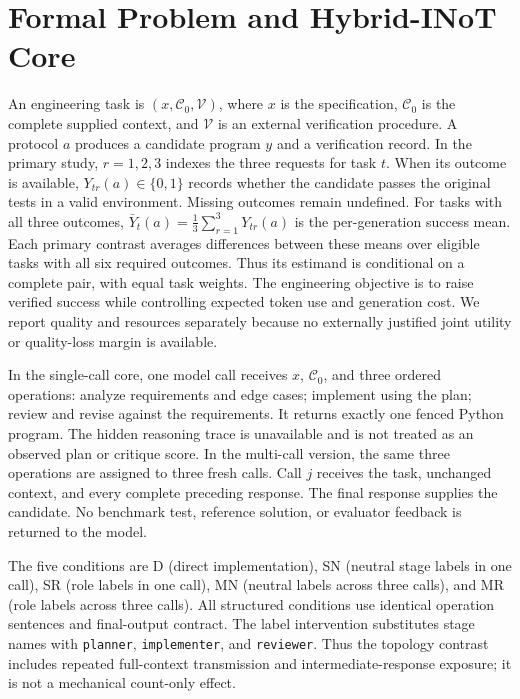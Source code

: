 \section{Formal Problem and Hybrid-INoT Core}
An engineering task is $(x,\mathcal{C}_0,\mathcal{V})$, where $x$ is the specification, $\mathcal{C}_0$ is the complete supplied context, and $\mathcal{V}$ is an external verification procedure. A protocol $a$ produces a candidate program $y$ and a verification record. In the primary study, $r=1,2,3$ indexes the three requests for task $t$. When its outcome is available, $Y_{tr}(a)\in\{0,1\}$ records whether the candidate passes the original tests in a valid environment. Missing outcomes remain undefined. For tasks with all three outcomes, $\bar Y_t(a)=\frac{1}{3}\sum_{r=1}^{3}Y_{tr}(a)$ is the per-generation success mean. Each primary contrast averages differences between these means over eligible tasks with all six required outcomes. Thus its estimand is conditional on a complete pair, with equal task weights. The engineering objective is to raise verified success while controlling expected token use and generation cost. We report quality and resources separately because no externally justified joint utility or quality-loss margin is available.

In the single-call core, one model call receives $x$, $\mathcal{C}_0$, and three ordered operations: analyze requirements and edge cases; implement using the plan; review and revise against the requirements. It returns exactly one fenced Python program. The hidden reasoning trace is unavailable and is not treated as an observed plan or critique score. In the multi-call version, the same three operations are assigned to three fresh calls. Call $j$ receives the task, unchanged context, and every complete preceding response. The final response supplies the candidate. No benchmark test, reference solution, or evaluator feedback is returned to the model.

The five conditions are D (direct implementation), SN (neutral stage labels in one call), SR (role labels in one call), MN (neutral labels across three calls), and MR (role labels across three calls). All structured conditions use identical operation sentences and final-output contract. The label intervention substitutes stage names with \texttt{planner}, \texttt{implementer}, and \texttt{reviewer}. Thus the topology contrast includes repeated full-context transmission and intermediate-response exposure; it is not a mechanical count-only effect.

